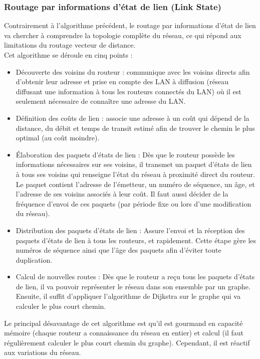   \subsubsection{Routage par informations d’état de lien (Link State)}\label{sc:rout_lien}
Contrairement à l’algorithme précédent, le routage par informations d’état de lien va chercher à comprendre la topologie complète du réseau, ce qui répond aux limitations du routage vecteur de distance.
\\
Cet algorithme se déroule en cinq points :
\begin{itemize}
\item Découverte des voisins du routeur : communique avec les voisins directs afin d’obtenir leur adresse et prise en compte des LAN à diffusion (réseau diffusant une information à tous les routeurs connectés du LAN) où il est seulement nécessaire de connaître une adresse du LAN.
\item Définition des coûts de lien : associe une adresse à un coût qui dépend de la distance, du débit et temps de transit estimé afin de trouver le chemin le plus optimal (au coût moindre).
\item Élaboration des paquets d’états de lien : Dès que le routeur possède les informations nécessaires sur ses voisins, il transmet un paquet d’états de lien à tous ses voisins qui renseigne l’état du réseau à proximité direct du routeur.
\\
Le paquet contient l’adresse de l’émetteur, un numéro de séquence, un âge, et l’adresse de ses voisins associés à leur coût. Il faut aussi décider de la fréquence d’envoi de ces paquets (par période fixe ou lors d’une modification du réseau).
\item Distribution des paquets d’états de lien : Assure l’envoi et la réception des paquets d’états de lien à tous les routeurs, et rapidement. Cette étape gère les numéros de séquence ainsi que l’âge des paquets afin d’éviter toute duplication.
\item Calcul de nouvelles routes : Dès que le routeur a reçu tous les paquets d’états de lien, il va pouvoir représenter le réseau dans son ensemble par un graphe. Ensuite, il suffit d’appliquer l’algorithme de Dijkstra sur le graphe qui va calculer le plus court chemin.
\end{itemize}
\medskip

Le principal désavantage de cet algorithme est qu’il est gourmand en capacité mémoire (chaque routeur a connaissance du réseau en entier) et calcul (il faut régulièrement calculer le plus court chemin du graphe).
Cependant, il est réactif aux variations du réseau.



